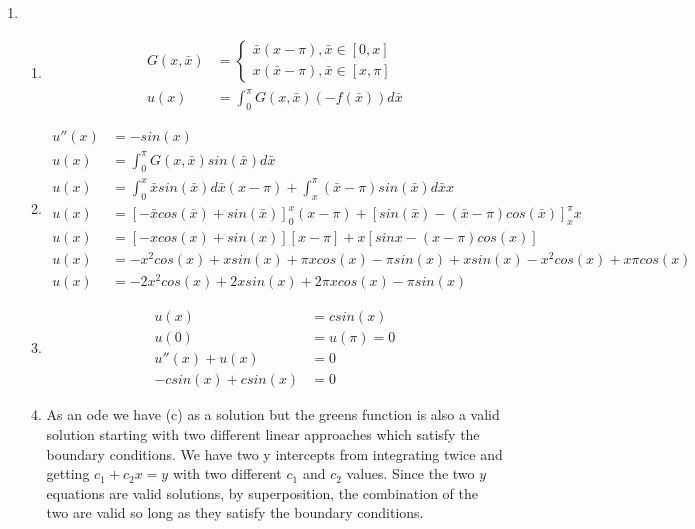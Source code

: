 \documentclass{article}
\begin{document}

\begin{enumerate}

\item 
	\begin{enumerate}
	\item
	\begin{equation*}
	\begin{split}
	G(x,\bar{x}) &= \begin{cases}
		\bar{x}(x-\pi), \bar{x} \in [0,x] \\
		x(\bar{x}-\pi), \bar{x} \in [x,\pi]
		\end{cases} \\
	u(x) &= \int_{0}^{\pi} G(x,\bar{x}) (- f(\bar{x}))d\bar{x}
	\end{split}
	\end{equation*}
	\item
	\begin{equation*}
	\begin{split}
	u''(x) &= -sin(x) \\
	u(x) &= \int_{0}^{\pi} G(x,\bar{x}) sin(\bar{x}) d\bar{x} \\
	u(x) & = \int_{0}^{x}\bar{x}sin(\bar{x})d\bar{x} (x-\pi) + \int_{x}^{\pi}(\bar{x} -\pi) sin(\bar{x})d\bar{x} x \\
	u(x) & = [-\bar{x}cos(\bar{x})+sin(\bar{x})]_{0}^{x} (x-\pi) + [sin(\bar{x}) - (\bar{x}-\pi)cos(\bar{x})]_{x}^{\pi} x \\
	u(x) & = [-xcos(x)+sin(x)][x-\pi] + x[sinx-(x-\pi)cos(x)] \\
	u(x) & = -x^{2}cos(x)+xsin(x) +\pi x cos(x) -\pi sin(x) + xsin(x) -x^{2}cos(x) + x \pi cos(x) \\
	u(x) & = -2x^{2} cos(x) + 2xsin(x) + 2 \pi x cos(x) -\pi sin(x) 
	\end{split}
	\end{equation*}
	\item
	\begin{equation*}
	\begin{split}
	u(x) & = c sin(x) \\
	u(0) & = u(\pi) = 0 \\
	u''(x) + u(x) & = 0 \\
	-csin(x)+csin(x) & = 0
	\end{split}
	\end{equation*}
	\item
As an ode we have (c) as a solution but the greens function is also a valid solution starting with two different linear approaches which satisfy the boundary conditions. We have two y intercepts from integrating twice and getting $c_{1} + c_{2}x = y$ with two different $c_{1}$ and $c_{2}$ values. Since the two $y$ equations are valid solutions, by superposition, the combination of the two are valid so long as they satisfy the boundary conditions. 

\end{enumerate}
\end{enumerate}
\end{document}
